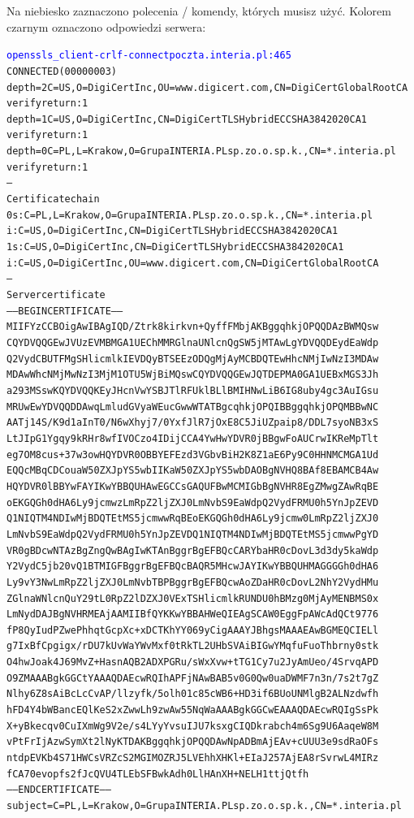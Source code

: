 \begin{enumerate}[label=\textbf{6.\arabic*}]
\newpage 
\noindent Na niebiesko zaznaczono polecenia / komendy, których musisz użyć. Kolorem czarnym oznaczono odpowiedzi serwera:\\ \mbox{}
\scriptsize
\begin{alltt}
\textcolor{blue}{openssl s_client -crlf -connect poczta.interia.pl:465}
CONNECTED(00000003)
depth=2 C = US, O = DigiCert Inc, OU = www.digicert.com, CN = DigiCert Global Root CA
verify return:1
depth=1 C = US, O = DigiCert Inc, CN = DigiCert TLS Hybrid ECC SHA384 2020 CA1
verify return:1
depth=0 C = PL, L = Krakow, O = Grupa INTERIA.PL sp. z o.o. sp. k., CN = *.interia.pl
verify return:1
---
Certificate chain
 0 s:C = PL, L = Krakow, O = Grupa INTERIA.PL sp. z o.o. sp. k., CN = *.interia.pl
   i:C = US, O = DigiCert Inc, CN = DigiCert TLS Hybrid ECC SHA384 2020 CA1
 1 s:C = US, O = DigiCert Inc, CN = DigiCert TLS Hybrid ECC SHA384 2020 CA1
   i:C = US, O = DigiCert Inc, OU = www.digicert.com, CN = DigiCert Global Root CA
---
Server certificate
-----BEGIN CERTIFICATE-----
MIIFYzCCBOigAwIBAgIQD/Ztrk8kirkvn+QyffFMbjAKBggqhkjOPQQDAzBWMQsw
CQYDVQQGEwJVUzEVMBMGA1UEChMMRGlnaUNlcnQgSW5jMTAwLgYDVQQDEydEaWdp
Q2VydCBUTFMgSHlicmlkIEVDQyBTSEEzODQgMjAyMCBDQTEwHhcNMjIwNzI3MDAw
MDAwWhcNMjMwNzI3MjM1OTU5WjBiMQswCQYDVQQGEwJQTDEPMA0GA1UEBxMGS3Jh
a293MSswKQYDVQQKEyJHcnVwYSBJTlRFUklBLlBMIHNwLiB6IG8uby4gc3AuIGsu
MRUwEwYDVQQDDAwqLmludGVyaWEucGwwWTATBgcqhkjOPQIBBggqhkjOPQMBBwNC
AATj14S/K9d1aInT0/N6wXhyj7/0YxfJlR7jOxE8C5JiUZpaip8/DDL7syoNB3xS
LtJIpG1Ygqy9kRHr8wfIVOCzo4IDijCCA4YwHwYDVR0jBBgwFoAUCrwIKReMpTlt
eg7OM8cus+37w3owHQYDVR0OBBYEFEzd3VGbvBiH2K8Z1aE6Py9C0HHNMCMGA1Ud
EQQcMBqCDCouaW50ZXJpYS5wbIIKaW50ZXJpYS5wbDAOBgNVHQ8BAf8EBAMCB4Aw
HQYDVR0lBBYwFAYIKwYBBQUHAwEGCCsGAQUFBwMCMIGbBgNVHR8EgZMwgZAwRqBE
oEKGQGh0dHA6Ly9jcmwzLmRpZ2ljZXJ0LmNvbS9EaWdpQ2VydFRMU0h5YnJpZEVD
Q1NIQTM4NDIwMjBDQTEtMS5jcmwwRqBEoEKGQGh0dHA6Ly9jcmw0LmRpZ2ljZXJ0
LmNvbS9EaWdpQ2VydFRMU0h5YnJpZEVDQ1NIQTM4NDIwMjBDQTEtMS5jcmwwPgYD
VR0gBDcwNTAzBgZngQwBAgIwKTAnBggrBgEFBQcCARYbaHR0cDovL3d3dy5kaWdp
Y2VydC5jb20vQ1BTMIGFBggrBgEFBQcBAQR5MHcwJAYIKwYBBQUHMAGGGGh0dHA6
Ly9vY3NwLmRpZ2ljZXJ0LmNvbTBPBggrBgEFBQcwAoZDaHR0cDovL2NhY2VydHMu
ZGlnaWNlcnQuY29tL0RpZ2lDZXJ0VExTSHlicmlkRUNDU0hBMzg0MjAyMENBMS0x
LmNydDAJBgNVHRMEAjAAMIIBfQYKKwYBBAHWeQIEAgSCAW0EggFpAWcAdQCt9776
fP8QyIudPZwePhhqtGcpXc+xDCTKhYY069yCigAAAYJBhgsMAAAEAwBGMEQCIELl
g7IxBfCpgigx/rDU7kUvWaYWvMxf0tRkTL2UHbSVAiBIGwYMqfuFuoThbrny0stk
O4hwJoak4J69MvZ+HasnAQB2ADXPGRu/sWxXvw+tTG1Cy7u2JyAmUeo/4SrvqAPD
O9ZMAAABgkGGCtYAAAQDAEcwRQIhAPFjNAwBAB5v0G0Qw0uaDWMF7n3n/7s2t7gZ
Nlhy6Z8sAiBcLcCvAP/llzyfk/5olh01c85cWB6+HD3if6BUoUNMlgB2ALNzdwfh
hFD4Y4bWBancEQlKeS2xZwwLh9zwAw55NqWaAAABgkGGCwEAAAQDAEcwRQIgSsPk
X+yBkecqv0CuIXmWg9V2e/s4LYyYvsuIJU7ksxgCIQDkrabch4m6Sg9U6AaqeW8M
vPtFrIjAzwSymXt2lNyKTDAKBggqhkjOPQQDAwNpADBmAjEAv+cUUU3e9sdRaOFs
ntdpEVKb4S71HWCsVRZcS2MGIMOZRJ5LVEhhXHKl+EIaJ257AjEA8rSvrwL4MIRz
fCA70evopfs2fJcQVU4TLEbSFBwkAdh0LlHAnXH+NELH1ttjQtfh
-----END CERTIFICATE-----
subject=C = PL, L = Krakow, O = Grupa INTERIA.PL sp. z o.o. sp. k., CN = *.interia.pl


\end{alltt}
\end{enumerate}
